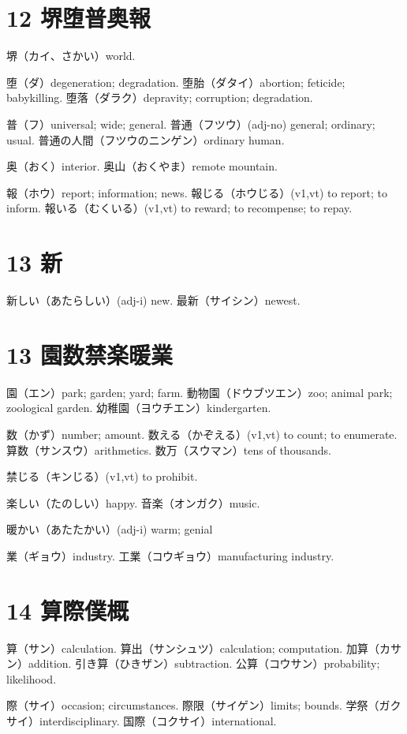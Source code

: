 \section{12 堺堕普奥報}

堺（カイ、さかい）world.

堕（ダ）degeneration; degradation.
堕胎（ダタイ）abortion; feticide; babykilling.
堕落（ダラク）depravity; corruption; degradation.

普（フ）universal; wide; general.
普通（フツウ）(adj-no) general; ordinary; usual.
普通の人間（フツウのニンゲン）ordinary human.

奥（おく）interior.
奥山（おくやま）remote mountain.

報（ホウ）report; information; news.
報じる（ホウじる）(v1,vt) to report; to inform.
報いる（むくいる）(v1,vt) to reward; to recompense; to repay.

\section{13 新}

新しい（あたらしい）(adj-i) new.
最新（サイシン）newest.

\section{13 園数禁楽暖業}

園（エン）park; garden; yard; farm.
動物園（ドウブツエン）zoo; animal park; zoological garden.
幼稚園（ヨウチエン）kindergarten.

数（かず）number; amount.
数える（かぞえる）(v1,vt) to count; to enumerate.
算数（サンスウ）arithmetics.
数万（スウマン）tens of thousands.

禁じる（キンじる）(v1,vt) to prohibit.

楽しい（たのしい）happy.
音楽（オンガク）music.

暖かい（あたたかい）(adj-i) warm; genial

業（ギョウ）industry.
工業（コウギョウ）manufacturing industry.

\section{14 算際僕概}

算（サン）calculation.
算出（サンシュツ）calculation; computation.
加算（カサン）addition.
引き算（ひきザン）subtraction.
公算（コウサン）probability; likelihood.

際（サイ）occasion; circumstances.
際限（サイゲン）limits; bounds.
学祭（ガクサイ）interdisciplinary.
国際（コクサイ）international.

